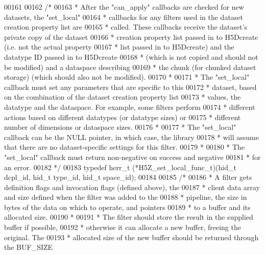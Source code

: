 \begin{DoxyCode}
00161 
00162 \textcolor{comment}{/*}
00163 \textcolor{comment}{ * After the "can\_apply" callbacks are checked for new datasets, the "set\_local"}
00164 \textcolor{comment}{ * callbacks for any filters used in the dataset creation property list are}
00165 \textcolor{comment}{ * called.  These callbacks receive the dataset's private copy of the dataset}
00166 \textcolor{comment}{ * creation property list passed in to H5Dcreate (i.e. not the actual property}
00167 \textcolor{comment}{ * list passed in to H5Dcreate) and the datatype ID passed in to H5Dcreate}
00168 \textcolor{comment}{ * (which is not copied and should not be modified) and a dataspace describing}
00169 \textcolor{comment}{ * the chunk (for chunked dataset storage) (which should also not be modified).}
00170 \textcolor{comment}{ *}
00171 \textcolor{comment}{ * The "set\_local" callback must set any parameters that are specific to this}
00172 \textcolor{comment}{ * dataset, based on the combination of the dataset creation property list}
00173 \textcolor{comment}{ * values, the datatype and the dataspace.  For example, some filters perform}
00174 \textcolor{comment}{ * different actions based on different datatypes (or datatype sizes) or}
00175 \textcolor{comment}{ * different number of dimensions or dataspace sizes.}
00176 \textcolor{comment}{ *}
00177 \textcolor{comment}{ * The "set\_local" callback can be the NULL pointer, in which case, the library}
00178 \textcolor{comment}{ * will assume that there are no dataset-specific settings for this filter.}
00179 \textcolor{comment}{ *}
00180 \textcolor{comment}{ * The "set\_local" callback must return non-negative on success and negative}
00181 \textcolor{comment}{ * for an error.}
00182 \textcolor{comment}{ */}
00183 \textcolor{keyword}{typedef} herr\_t (*H5Z\_set\_local\_func\_t)(hid\_t dcpl\_id, hid\_t type\_id, hid\_t space\_id);
00184 
00185 \textcolor{comment}{/*}
00186 \textcolor{comment}{ * A filter gets definition flags and invocation flags (defined above), the}
00187 \textcolor{comment}{ * client data array and size defined when the filter was added to the}
00188 \textcolor{comment}{ * pipeline, the size in bytes of the data on which to operate, and pointers}
00189 \textcolor{comment}{ * to a buffer and its allocated size.}
00190 \textcolor{comment}{ *}
00191 \textcolor{comment}{ * The filter should store the result in the supplied buffer if possible,}
00192 \textcolor{comment}{ * otherwise it can allocate a new buffer, freeing the original.  The}
00193 \textcolor{comment}{ * allocated size of the new buffer should be returned through the BUF\_SIZE}

\end{DoxyCode}

